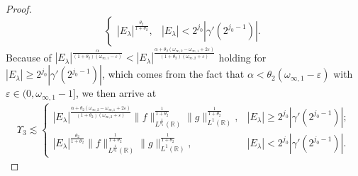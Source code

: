 \documentclass[11pt, twoside, leqno]{article}
\theoremstyle{definition}
\numberwithin{equation}{section}
\begin{document}
\begin{proof}
$$\begin{cases}
  |E_\lambda|^{\frac{\theta_{2}}{1+\theta_{2}}}, & |E_\lambda|<2^{j_0}|\gamma'(2^{j_{0}-1})|.
\end{cases}$$
Because of $|E_\lambda|^{\frac{\alpha}{(1+\theta_{2})(\omega_{\infty,1}-\varepsilon)}}< |E_\lambda|^{\frac{\alpha+\theta_{2}(\omega_{\infty,2}-\omega_{\infty,1}+2\varepsilon)}{(1+\theta_{2})(\omega_{\infty,2}+\varepsilon)}}$ holding for $|E_\lambda|\geq2^{j_0}|\gamma'(2^{j_{0}-1})|$, which comes from the fact that $\alpha<\theta_2(\omega_{\infty,1}-\varepsilon)$ with $\varepsilon\in(0, \omega_{\infty,1}-1]$, we then arrive at
\begin{align}\label{eq:5.5}
\Upsilon_{3}\lesssim
\begin{cases}
  |E_\lambda|^{\frac{\alpha+\theta_{2}(\omega_{\infty,2}-\omega_{\infty,1}+2\varepsilon)}{(1+\theta_{2})(\omega_{\infty,2}+\varepsilon)}}\|f\|^{\frac{1}{1+\theta_2}}_{L^{\frac{1}{\theta_2}}(\mathbb{R})}\|g\|^{\frac{1}{1+\theta_2}}_{L^{1}(\mathbb{R})}, & |E_\lambda|\geq2^{j_0}|\gamma'(2^{j_{0}-1})|; \\
  |E_\lambda|^{\frac{\theta_{2}}{1+\theta_{2}}}\|f\|^{\frac{1}{1+\theta_2}}_{L^{\frac{1}{\theta_2}}(\mathbb{R})}\|g\|^{\frac{1}{1+\theta_2}}_{L^{1}(\mathbb{R})}, & |E_\lambda|<2^{j_0}|\gamma'(2^{j_{0}-1})|.
\end{cases}
 \end{align}


\end{proof}
\end{document}
